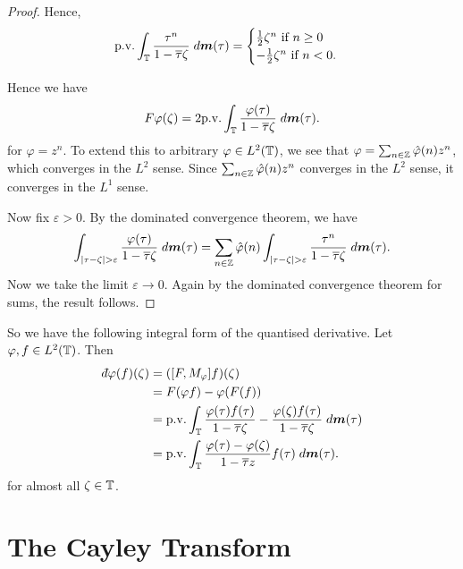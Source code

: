 \begin{proof}
    Hence, 
    \begin{equation}
        \mathrm{p.v.}\int_{\mathbb{T}} \frac{\tau^n}{1-\overline{\tau}\zeta}\;d\boldsymbol{m}(\tau) = \begin{cases}
            \frac{1}{2}\zeta^n\text{ if }n \geq 0\\
            -\frac{1}{2}\zeta^n\text{ if }n < 0.
        \end{cases}
    \end{equation}
    
    Hence we have
    \begin{equation}
        F\varphi(\zeta) = 2\mathrm{p.v.} \int_{\mathbb{T}} \frac{\varphi(\tau)}{1-\overline{\tau}\zeta}\;d\boldsymbol{m}(\tau).
    \end{equation}
    for $\varphi = z^n$. To extend this to arbitrary $\varphi \in L^2(\mathbb{T})$, we see that $\varphi = \sum_{n \in \mathbb{Z}} \hat{\varphi}(n)z^n$, which
    converges in the $L^2$ sense. Since $\sum_{n\in\mathbb{Z}} \hat{\varphi}(n)z^n$ converges in the $L^2$ sense, it converges in the $L^1$ sense.
    
    Now fix $\varepsilon > 0$. By the dominated convergence theorem, we have
    \begin{equation}
        \int_{|\tau-\zeta| > \varepsilon} \frac{\varphi(\tau)}{1-\overline{\tau}\zeta}\;d\ha(\tau) = \sum_{n \in \Itgr} \hat{\varphi}(n)\int_{|\tau-\zeta|> \varepsilon} \frac{\tau^n}{1-\overline{\tau}\zeta}\;d\ha(\tau).
    \end{equation}
    Now we take the limit $\varepsilon \to 0$. Again by the dominated convergence theorem for sums, the result follows.
    
\end{proof}

So we have the following integral form of the quantised derivative. Let $\varphi,f \in L^2(\mathbb{T})$.
Then
\begin{align}
    \qd\varphi(f)(\zeta) &= ([F,M_\varphi]f)(\zeta) \\
                         &= F(\varphi f)-\varphi(F(f))\\
                         &= \pvint_{\Circ} \frac{\varphi(\tau)f(\tau)}{1-\overline{\tau}\zeta}-\frac{\varphi(\zeta)f(\tau)}{1-\overline{\tau}\zeta}\;d\ha(\tau)\\
                         &=  \pvint_\Circ \frac{\varphi(\tau)-\varphi(\zeta)}{1-\overline{\tau}z}f(\tau)\;d\ha(\tau).
\end{align}
for almost all $\zeta \in \mathbb{T}$.

\section{The Cayley Transform}

